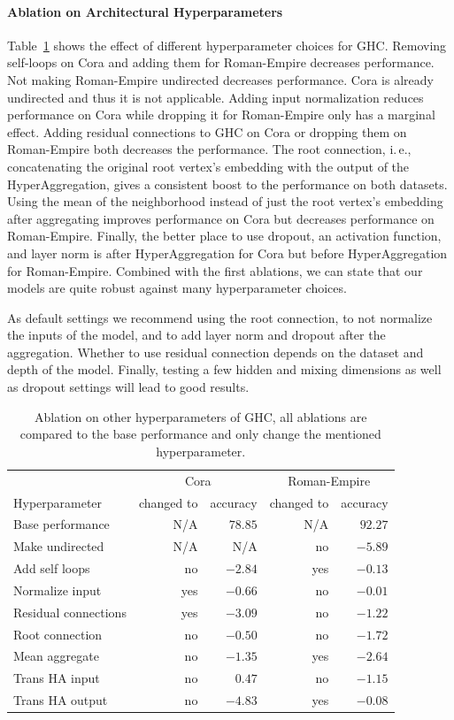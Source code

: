 \documentclass[conference]{IEEEtran}
\newcommand{\ie}{i.\,e.,\xspace}
\begin{document}
\paragraph*{Ablation on Architectural Hyperparameters}
Table~\ref{tab:abl} shows the effect of different hyperparameter choices for GHC.
Removing self-loops on Cora and adding them for Roman-Empire decreases performance.
Not making Roman-Empire undirected decreases performance.
Cora is already undirected and thus it is not applicable.
Adding input normalization reduces performance on Cora while dropping it for Roman-Empire only has a marginal effect.
Adding residual connections to GHC on Cora or dropping them on Roman-Empire both decreases the performance.
The root connection, \ie concatenating the original root vertex's embedding with the output of the HyperAggregation, gives a consistent boost to the performance on both datasets.
Using the mean of the neighborhood instead of just the root vertex's embedding after aggregating improves performance on Cora but decreases performance on Roman-Empire.
Finally, the better place to use dropout, an activation function, and layer norm is after HyperAggregation for Cora but before HyperAggregation for Roman-Empire.
Combined with the first ablations, we can state that our models are quite robust against many hyperparameter choices.

As default settings we recommend using the root connection, to not normalize the inputs of the model, and to add layer norm and dropout after the aggregation.
Whether to use residual connection depends on the dataset and depth of the model.
Finally, testing a few hidden and mixing dimensions as well as dropout settings will lead to good results.

\begin{table}
\centering
\caption{Ablation on other hyperparameters of GHC, all ablations are compared to the base performance and only change the mentioned hyperparameter.}
\begin{tabular}{l|rr|rr} \toprule
  & \multicolumn{2}{c|}{Cora}  & \multicolumn{2}{c}{Roman-Empire} \\
Hyperparameter   & changed to & accuracy & changed to & accuracy \\ \midrule
Base performance & N/A & $78.85$ & N/A & $92.27$ \\ \midrule
Make undirected  & N/A & N/A & no & $-5.89$ \\
Add self loops   & no  & $-2.84$ & yes & $-0.13$ \\ \midrule
Normalize input  & yes & $-0.66$ & no & $-0.01$  \\
Residual connections & yes & $-3.09$ & no & $-1.22$ \\ 
Root connection  & no & $-0.50$ & no & $-1.72$ \\ 
Mean aggregate   & no & $-1.35$ & yes & $-2.64$ \\ 
Trans HA input   & no &  $0.47$ & no &  $-1.15$ \\ 
Trans HA output  & no & $-4.83$ & yes & $-0.08$  \\ 
\bottomrule
\end{tabular}
\label{tab:abl}
\end{table}
\end{document}
